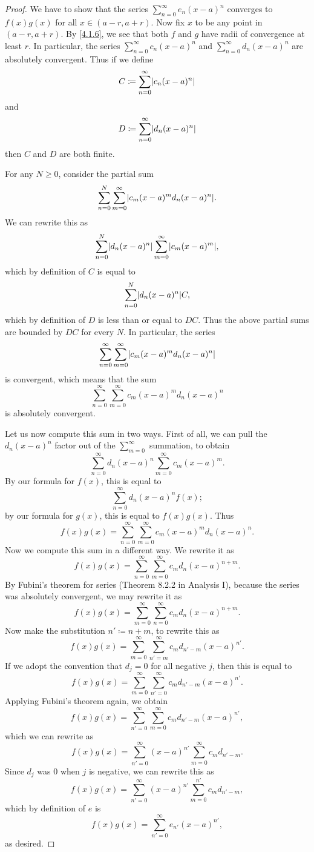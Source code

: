 \begin{proof}
  We have to show that the series \(\sum_{n = 0}^\infty e_n (x - a)^n\) converges to \(f(x) g(x)\) for all \(x \in (a - r, a + r)\).
  Now fix \(x\) to be any point in \((a - r, a + r)\).
  By \cref{4.1.6}, we see that both \(f\) and \(g\) have radii of convergence at least \(r\).
  In particular, the series \(\sum_{n = 0}^\infty c_n (x - a)^n\) and \(\sum_{n = 0}^\infty d_n (x - a)^n\) are absolutely convergent.
  Thus if we define
  \[
    C \coloneqq \sum_{n = 0}^\infty \abs{c_n (x - a)^n}
  \]
  and
  \[
    D \coloneqq \sum_{n = 0}^\infty \abs{d_n (x - a)^n}
  \]
  then \(C\) and \(D\) are both finite.

  For any \(N \geq 0\), consider the partial sum
  \[
    \sum_{n = 0}^N \sum_{m = 0}^\infty \abs{c_m (x - a)^m d_n (x - a)^n}.
  \]
  We can rewrite this as
  \[
    \sum_{n = 0}^N \abs{d_n (x - a)^n} \sum_{m = 0}^\infty \abs{c_m (x - a)^m},
  \]
  which by definition of \(C\) is equal to
  \[
    \sum_{n = 0}^N \abs{d_n (x - a)^n} C,
  \]
  which by definition of \(D\) is less than or equal to \(DC\).
  Thus the above partial sums are bounded by \(DC\) for every \(N\).
  In particular, the series
  \[
    \sum_{n = 0}^\infty \sum_{m = 0}^\infty \abs{c_m (x - a)^m d_n (x - a)^n}
  \]
  is convergent, which means that the sum
  \[
    \sum_{n = 0}^\infty \sum_{m = 0}^\infty c_m (x - a)^m d_n (x - a)^n
  \]
  is absolutely convergent.

  Let us now compute this sum in two ways.
  First of all, we can pull the \(d_n (x - a)^n\) factor out of the \(\sum_{m = 0}^\infty\) summation, to obtain
  \[
    \sum_{n = 0}^\infty d_n (x - a)^n \sum_{m = 0}^\infty c_m (x - a)^m.
  \]
  By our formula for \(f(x)\), this is equal to
  \[
    \sum_{n = 0}^\infty d_n (x - a)^n f(x);
  \]
  by our formula for \(g(x)\), this is equal to \(f(x) g(x)\).
  Thus
  \[
    f(x) g(x) = \sum_{n = 0}^\infty \sum_{m = 0}^\infty c_m (x - a)^m d_n (x - a)^n.
  \]
  Now we compute this sum in a different way.
  We rewrite it as
  \[
    f(x) g(x) = \sum_{n = 0}^\infty \sum_{m = 0}^\infty c_m d_n (x - a)^{n + m}.
  \]
  By Fubini's theorem for series (Theorem 8.2.2 in Analysis I), because the series was absolutely convergent, we may rewrite it as
  \[
    f(x) g(x) = \sum_{m = 0}^\infty \sum_{n = 0}^\infty c_m d_n (x - a)^{n + m}.
  \]
  Now make the substitution \(n' \coloneqq n + m\), to rewrite this as
  \[
    f(x) g(x) = \sum_{m = 0}^\infty \sum_{n' = m}^\infty c_m d_{n' - m} (x - a)^{n'}.
  \]
  If we adopt the convention that \(d_j = 0\) for all negative \(j\), then this is equal to
  \[
    f(x) g(x) = \sum_{m = 0}^\infty \sum_{n' = 0}^\infty c_m d_{n' - m} (x - a)^{n'}.
  \]
  Applying Fubini's theorem again, we obtain
  \[
    f(x) g(x) = \sum_{n' = 0}^\infty \sum_{m = 0}^\infty c_m d_{n' - m} (x - a)^{n'},
  \]
  which we can rewrite as
  \[
    f(x) g(x) = \sum_{n' = 0}^\infty (x - a)^{n'} \sum_{m = 0}^\infty c_m d_{n' - m}.
  \]
  Since \(d_j\) was \(0\) when \(j\) is negative, we can rewrite this as
  \[
    f(x) g(x) = \sum_{n' = 0}^\infty (x - a)^{n'} \sum_{m = 0}^{n'} c_m d_{n' - m},
  \]
  which by definition of \(e\) is
  \[
    f(x) g(x) = \sum_{n' = 0}^\infty e_{n'} (x - a)^{n'},
  \]
  as desired.
\end{proof}

